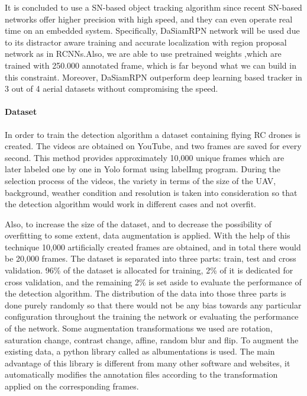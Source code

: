 \documentclass[12pt]{article}
\begin{document}
\justify It is concluded to use a SN-based object tracking algorithm since recent SN-based networks offer higher precision with high speed, and they can even operate real time \cite{shen2022real} on an embedded system. Specifically, DaSiamRPN network will be used due to its distractor aware training and accurate localization with region proposal network as in RCNNs.Also, we are able to use pretrained weights ,which are trained with 250.000 annotated frame, which is far beyond what we can build in this constraint. Moreover, DaSiamRPN outperform deep learning based tracker in 3 out of 4 aerial datasets \cite{isaac2021unmanned} without compromising the speed. 

\paragraph{Dataset}
\justify In order to train the detection algorithm a dataset containing flying RC drones is created. The videos are obtained on YouTube, and two frames are saved for every second. This method provides approximately 10,000 unique frames which are later labeled one by one in Yolo format using labelImg program.
\justify During the selection process of the videos, the variety in terms of the size of the UAV, background, weather condition and resolution is taken into consideration so that the detection algorithm would work in different cases and not overfit.

\justify Also, to increase the size of the dataset, and to decrease the possibility of overfitting to some extent, data augmentation is applied. With the help of this technique 10,000 artificially created frames are obtained, and in total there would be 20,000 frames. The dataset is separated into three parts: train, test and cross validation. 96\% of the dataset is allocated for training, 2\% of it is dedicated for cross validation, and the remaining 2\% is set aside to evaluate the performance of the detection algorithm. The distribution of the data into those three parts is done purely randomly so that there would not be any bias towards any particular configuration throughout the training the network or evaluating the performance of the network.
\justify Some augmentation transformations we used are rotation, saturation change, contrast change, affine, random blur and flip. To augment the existing data, a python library called as albumentations is used. The main advantage of this library is different from many other software and websites, it automatically modifies the annotation files according to the transformation applied on the corresponding frames. 
\end{document}
